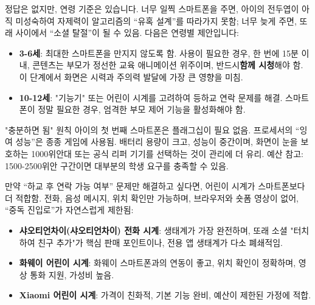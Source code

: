 


정답은 없지만, 연령 기준은 있습니다. 너무 일찍 스마트폰을 주면, 아이의 전두엽이 아직 미성숙하여 자제력이 알고리즘의 “유혹 설계”를 따라가지 못함; 너무 늦게 주면, 또래 사이에서 “소셜 탈절”이 될 수 있음. 다음은 연령별 제안입니다:

\begin{itemize}
  \item \textbf{3-6세}: 최대한 스마트폰을 만지지 않도록 함. 사용이 필요한 경우, 한 번에 15분 이내, 콘텐츠는 부모가 정선한 교육 애니메이션 위주이며, 반드시\textbf{함께 시청}해야 함. 이 단계에서 화면은 시력과 주의력 발달에 가장 큰 영향을 미침.
  \item \textbf{10-12세}: "기능기" 또는 어린이 시계를 고려하여 등하교 연락 문제를 해결. 스마트폰이 정말 필요한 경우, 엄격한 부모 제어 기능을 활성화해야 함.
\end{itemize}

\begin{tcbinfo}{"충분하면 됨" 원칙}
아이의 첫 번째 스마트폰은 플래그십이 필요 없음. 프로세서의 “잉여 성능”은 종종 게임에 사용됨. 배터리 용량이 크고, 성능이 중간이며, 화면이 눈을 보호하는 1000위안대 또는 공식 리퍼 기기를 선택하는 것이 관리에 더 유리. 예산 참고: 1500-2500위안 구간이면 대부분의 학생 요구를 충족할 수 있음.

\end{tcbinfo}


만약 “하교 후 연락 가능 여부” 문제만 해결하고 싶다면, 어린이 시계가 스마트폰보다 더 적합함. 전화, 음성 메시지, 위치 확인만 가능하며, 브라우저와 숏폼 영상이 없어, “중독 진입로”가 자연스럽게 제한됨:

\begin{itemize}
  \item \textbf{샤오티언차이(샤오티언차이) 전화 시계}: 생태계가 가장 완전하며, 또래 소셜 "터치하여 친구 추가"가 핵심 판매 포인트이나, 전용 앱 생태계가 다소 폐쇄적임.
  \item \textbf{화웨이 어린이 시계}: 화웨이 스마트폰과의 연동이 좋고, 위치 확인이 정확하며, 영상 통화 지원, 가성비 높음.
  \item \textbf{Xiaomi 어린이 시계}: 가격이 친화적, 기본 기능 완비, 예산이 제한된 가정에 적합.
\end{itemize}

